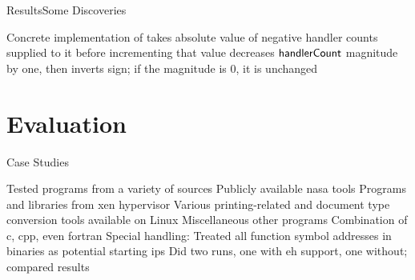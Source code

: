 \begin{frame}{Results}{Some Discoveries}
  \begin{outline}
    \1 Concrete implementation of  takes absolute value of negative handler counts supplied to it before incrementing that value
    \1  decreases $\mathsf{handlerCount}$ magnitude by one, then inverts sign; if the magnitude is 0, it is unchanged
  \end{outline}
\end{frame}

\section{Evaluation}
\begin{frame}{Case Studies}
  \begin{outline}
    \1<+-> Tested  programs from a variety of sources
    \2 Publicly available \gls{nasa} tools
    \2 Programs and libraries from \gls{xen} hypervisor
    \2 Various printing-related and document type conversion tools available on Linux
    \2 Miscellaneous other programs
    \1<+-> Combination of \gls{c}, \gls{cpp}, even \gls{fortran}
    \1<+-> Special handling:
    \2<+-> Treated all function symbol addresses in binaries as potential starting \glspl{ip}
    \2<+-> Did two runs, one with \gls{eh} support, one without; compared results
  \end{outline}
\end{frame}

